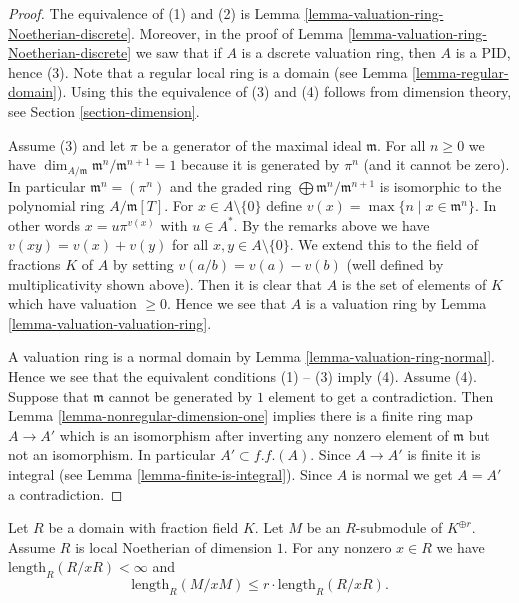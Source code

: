 \begin{proof}
The equivalence of (1) and (2) is
Lemma \ref{lemma-valuation-ring-Noetherian-discrete}.
Moreover, in the proof of Lemma \ref{lemma-valuation-ring-Noetherian-discrete}
we saw that if $A$ is a dscrete valuation ring, then $A$ is a PID, hence (3).
Note that a regular local ring is a domain (see
Lemma \ref{lemma-regular-domain}). Using this the equivalence of (3) and (4)
follows from dimension theory, see Section \ref{section-dimension}.

\medskip\noindent
Assume (3) and let $\pi$ be a generator of the maximal ideal $\mathfrak m$.
For all $n \geq 0$ we have
$\dim_{A/\mathfrak m} \mathfrak m^n/\mathfrak m^{n + 1} = 1$
because it is generated by $\pi^n$ (and it cannot be zero).
In particular $\mathfrak m^n = (\pi^n)$ and
the graded ring $\bigoplus \mathfrak m^n/\mathfrak m^{n + 1}$
is isomorphic to the polynomial ring $A/\mathfrak m[T]$.
For $x \in A \setminus \{0\}$ define
$v(x) = \max\{n \mid x \in \mathfrak m^n\}$.
In other words $x = u \pi^{v(x)}$ with $u \in A^*$.
By the remarks above we have $v(xy) = v(x) + v(y)$
for all $x, y \in A \setminus \{0\}$. We extend this to the field of fractions
$K$ of $A$ by setting $v(a/b) = v(a) - v(b)$ (well defined by multiplicativity
shown above). Then it is clear that $A$ is the set of elements of
$K$ which have valuation $\geq 0$. Hence we see that $A$ is a
valuation ring by Lemma \ref{lemma-valuation-valuation-ring}.

\medskip\noindent
A valuation ring is a normal domain by Lemma \ref{lemma-valuation-ring-normal}.
Hence we see that the equivalent conditions (1) -- (3) imply
(4). Assume (4). Suppose that $\mathfrak m$ cannot be generated
by $1$ element to get a contradiction.
Then Lemma \ref{lemma-nonregular-dimension-one} implies there is a finite
ring map $A \to A'$ which is an isomorphism after inverting
any nonzero element of $\mathfrak m$ but not an isomorphism.
In particular $A' \subset f.f.(A)$.
Since $A \to A'$ is finite it is integral (see
Lemma \ref{lemma-finite-is-integral}).
Since $A$ is normal we get $A = A'$ a contradiction.
\end{proof}

\begin{lemma}
\label{lemma-finite-length}
Let $R$ be a domain with fraction field $K$.
Let $M$ be an $R$-submodule of $K^{\oplus r}$.
Assume $R$ is local Noetherian of dimension $1$.
For any nonzero $x \in R$ we have $\text{length}_R(R/xR) < \infty$
and
$$
\text{length}_R(M/xM) \leq r \cdot \text{length}_R(R/xR).
$$
\end{lemma}

